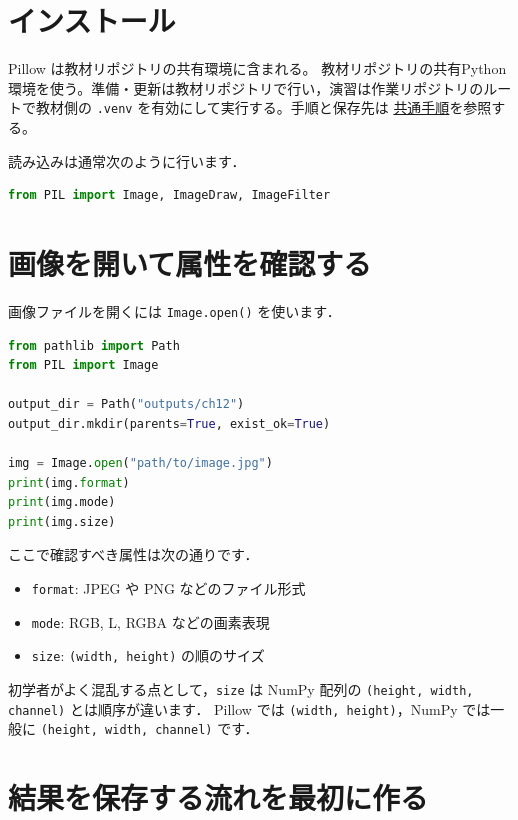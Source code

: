 \section{インストール}

Pillow は教材リポジトリの共有環境に含まれる。
教材リポジトリの共有Python環境を使う。準備・更新は教材リポジトリで行い，演習は作業リポジトリのルートで教材側の \texttt{.venv} を有効にして実行する。手順と保存先は \href{https://github.com/ykinolab-tokai/signal-ml-training/blob/main/handouts/README.md}{共通手順}を参照する。

読み込みは通常次のように行います．

\begin{lstlisting}[style=codecell,language=Python]
from PIL import Image, ImageDraw, ImageFilter
\end{lstlisting}


\section{画像を開いて属性を確認する}

画像ファイルを開くには \texttt{Image.open()} を使います．

\begin{lstlisting}[style=codecell,language=Python]
from pathlib import Path
from PIL import Image

output_dir = Path("outputs/ch12")
output_dir.mkdir(parents=True, exist_ok=True)

img = Image.open("path/to/image.jpg")
print(img.format)
print(img.mode)
print(img.size)
\end{lstlisting}

ここで確認すべき属性は次の通りです．
\begin{itemize}
\item \texttt{format}: JPEG や PNG などのファイル形式
\item \texttt{mode}: RGB, L, RGBA などの画素表現
\item \texttt{size}: \texttt{(width, height)} の順のサイズ
\end{itemize}

初学者がよく混乱する点として，\texttt{size} は NumPy 配列の \texttt{(height, width, channel)} とは順序が違います．
Pillow では \texttt{(width, height)}，NumPy では一般に \texttt{(height, width, channel)} です．


\section{結果を保存する流れを最初に作る}

